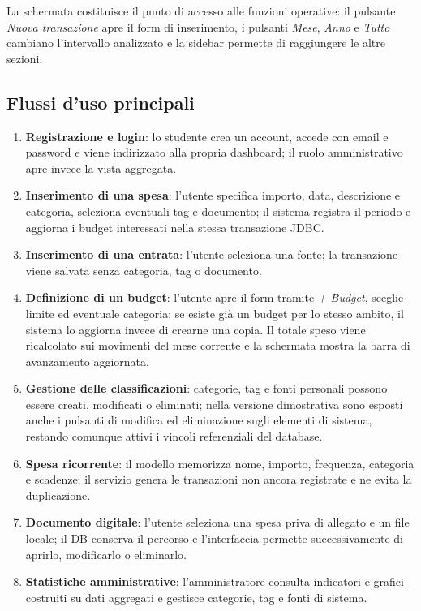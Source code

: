 \documentclass[11pt,a4paper]{article}
\begin{document}
La schermata costituisce il punto di accesso alle funzioni operative: il pulsante \emph{Nuova transazione} apre il form di inserimento, i pulsanti \emph{Mese}, \emph{Anno} e \emph{Tutto} cambiano l'intervallo analizzato e la sidebar permette di raggiungere le altre sezioni.

\subsection{Flussi d’uso principali}
\begin{enumerate}
    \item \textbf{Registrazione e login}: lo studente crea un account, accede con email e password e viene indirizzato alla propria dashboard; il ruolo amministrativo apre invece la vista aggregata.
    \item \textbf{Inserimento di una spesa}: l'utente specifica importo, data, descrizione e categoria, seleziona eventuali tag e documento; il sistema registra il periodo e aggiorna i budget interessati nella stessa transazione JDBC.
    \item \textbf{Inserimento di una entrata}: l'utente seleziona una fonte; la transazione viene salvata senza categoria, tag o documento.
    \item \textbf{Definizione di un budget}: l'utente apre il form tramite \emph{+ Budget}, sceglie limite ed eventuale categoria; se esiste già un budget per lo stesso ambito, il sistema lo aggiorna invece di crearne una copia. Il totale speso viene ricalcolato sui movimenti del mese corrente e la schermata mostra la barra di avanzamento aggiornata.
    \item \textbf{Gestione delle classificazioni}: categorie, tag e fonti personali possono essere creati, modificati o eliminati; nella versione dimostrativa sono esposti anche i pulsanti di modifica ed eliminazione sugli elementi di sistema, restando comunque attivi i vincoli referenziali del database.
    \item \textbf{Spesa ricorrente}: il modello memorizza nome, importo, frequenza, categoria e scadenze; il servizio genera le transazioni non ancora registrate e ne evita la duplicazione.
    \item \textbf{Documento digitale}: l'utente seleziona una spesa priva di allegato e un file locale; il DB conserva il percorso e l'interfaccia permette successivamente di aprirlo, modificarlo o eliminarlo.
    \item \textbf{Statistiche amministrative}: l'amministratore consulta indicatori e grafici costruiti su dati aggregati e gestisce categorie, tag e fonti di sistema.
\end{enumerate}
\end{document}
